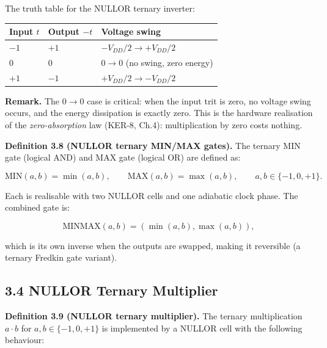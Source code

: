 The truth table for the NULLOR ternary inverter:

\begin{longtable}[]{@{}
  >{\raggedright\arraybackslash}p{}
  >{\raggedright\arraybackslash}p{}
  >{\raggedright\arraybackslash}p{}@{}}
\toprule\noalign{}
Input \(t\) & Output \(-t\) & Voltage swing \\
\midrule\noalign{}
\endhead
\bottomrule\noalign{}
\endlastfoot
\(-1\) & \(+1\) & \(-V_{DD}/2 \to +V_{DD}/2\) \\
\(0\) & \(0\) & \(0 \to 0\) (no swing, zero energy) \\
\(+1\) & \(-1\) & \(+V_{DD}/2 \to -V_{DD}/2\) \\
\end{longtable}

\textbf{Remark.} The \(0 \to 0\) case is critical: when the input
trit is zero, no voltage swing occurs, and the energy dissipation is
exactly zero. This is the hardware realisation of the
\emph{zero-absorption} law (KER-8, Ch.4): multiplication by zero
costs nothing.

\textbf{Definition 3.8 (NULLOR ternary MIN/MAX gates).} The ternary
MIN gate (logical AND) and MAX gate (logical OR) are defined as:

\[
\text{MIN}(a, b) = \min(a, b), \qquad
\text{MAX}(a, b) = \max(a, b),
\qquad a, b \in \{-1, 0, +1\}.
\]

Each is realisable with two NULLOR cells and one adiabatic clock
phase. The combined gate is:

\[
\text{MINMAX}(a, b) = (\min(a,b), \max(a,b)),
\]

which is its own inverse when the outputs are swapped, making it
reversible (a ternary Fredkin gate variant).

\subsection{3.4 NULLOR Ternary Multiplier}

\textbf{Definition 3.9 (NULLOR ternary multiplier).} The ternary
multiplication \(a \cdot b\) for \(a, b \in \{-1, 0, +1\}\) is
implemented by a NULLOR cell with the following behaviour:

